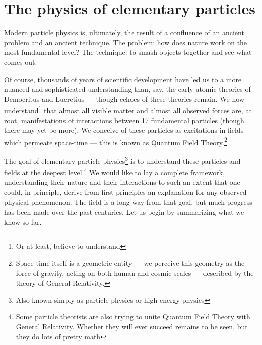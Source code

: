 \documentclass[../thesis.tex]{subfiles}
\begin{document}
\section{The physics of elementary particles}
	Modern particle physics is, ultimately, the result of a confluence of an ancient problem and an ancient technique. The problem: how does nature work on the most fundamental level? The technique: to smash objects together and see what comes out. 

	Of course, thousands of years of scientific development have led us to a more nuanced and sophisticated understanding than, say, the early atomic theories of Democritus and Lucretius --- though echoes of these theories remain. We now understand\footnote{Or at least, believe to understand} that almost all visible matter and almost all observed forces are, at root, manifestations of interactions between 17 fundamental particles (though there may yet be more). We conceive of these particles as excitations in fields which permeate space-time --- this is known as Quantum Field Theory.\footnote{Space-time itself is a geometric entity --- we perceive this geometry as the force of gravity, acting on both human and cosmic scales --- described by the theory of General Relativity.}

	The goal of elementary particle physics\footnote{Also known simply as particle physics or high-energy physics} is to understand these particles and fields at the deepest level.\footnote{Some particle theorists are also trying to unite Quantum Field Theory with General Relativity. Whether they will ever succeed remains to be seen, but they do lots of pretty math} We would like to lay a complete framework, understanding their nature and their interactions to such an extent that one could, in principle, derive from first principles an explanation for any observed physical phenomenon. The field is a long way from that goal, but much progress has been made over the past centuries. Let us begin by summarizing what we know so far.
\end{document}

